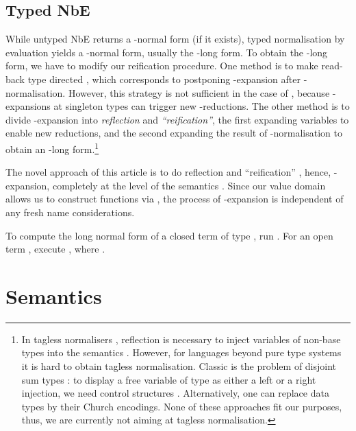 \documentclass{LMCS}
\begin{document}
\subsection{Typed NbE}

While untyped NbE returns a -normal form (if it exists), typed
normalisation by evaluation yields a -normal form, usually
the -long form.  To obtain the -long form, we have to
modify our reification procedure.  One method is to make read-back
type directed \cite{abelCoquandDybjer:mpc08}, which corresponds to
postponing -expansion after -normalisation. 
However, this strategy
is not sufficient in the case of , because
-expansions at singleton types can trigger new
-reductions.   The other method is to divide -expansion
into \emph{reflection} and \emph{``reification''}, the first expanding
variables to enable new reductions, and the second expanding the
result of -normalisation to obtain an -long
form.\footnote{In tagless normalisers
  \cite{bergerSchwichtenberg:lics91}, 
  reflection is necessary to
  inject variables  of non-base types  into the semantics
  .  However, for languages beyond pure type systems it is
  hard to obtain tagless normalisation.  Classic is the problem of
  disjoint sum types \cite{altenkirchDybjerHofmannScott:lics01}: to
  display a free variable of type  as either a left or a right
  injection, we need control structures
  \cite{balatDiCosmoFiore:popl04}.  Alternatively, one can replace
  data types by their Church encodings.  None of these approaches fit
  our purposes, thus, we are currently not aiming at tagless normalisation.}


The novel approach of this article is to do reflection  and
``reification'' , hence, -expansion, completely at
the level of
the semantics .  Since our value domain  allows us to
construct functions via , the process of -expansion is
independent of any fresh name considerations.

To compute the long normal form of a closed term  of type , 
run .  For an open term , execute , where .




 \section{Semantics}
\label{sec:semantics}
\end{document}
